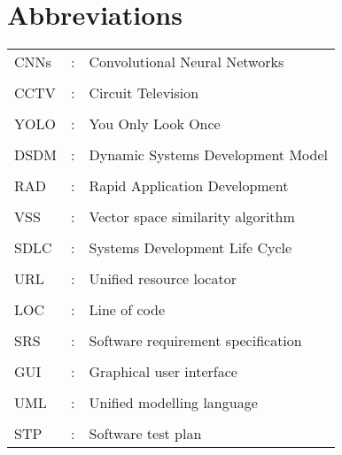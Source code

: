 \section*{Abbreviations}

\begin{table} [!h]
\begin{tabular}{l l l}
CNNs    & : &    Convolutional Neural Networks \\
\\

CCTV    & : &    Circuit Television \\
\\

YOLO 	& : & 	You Only Look Once \\
\\
DSDM 	& : & 	Dynamic Systems Development Model \\
\\
RAD	& : & 	Rapid Application Development \\
\\
VSS 	& : & 	Vector space similarity algorithm  \\
\\
SDLC		& : &	Systems Development Life Cycle\\
\\
URL	& : &	Unified resource locator	\\
\\
LOC		& : &	Line of code	\\
\\
SRS	& : &	Software requirement specification	\\
\\
GUI		& : &	Graphical user interface	\\
\\
UML	& : &	Unified modelling language	\\
\\
STP	& : &	Software test plan	\\
\end{tabular}
\end{table}